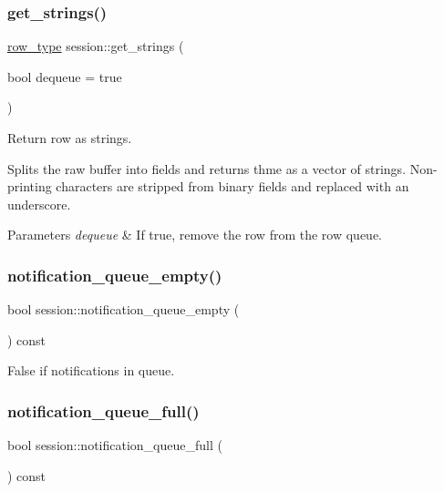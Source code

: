 \subsubsection{\texorpdfstring{get\+\_\+strings()}{get\_strings()}}
{\footnotesize\ttfamily \hyperlink{classsession_ae75ba42ea21ef0fabffb963ca7e36380}{row\+\_\+type} session\+::get\+\_\+strings (\begin{DoxyParamCaption}\item[{bool}]{dequeue = {\ttfamily true} }\end{DoxyParamCaption})\hspace{0.3cm}{\ttfamily [inline]}}



Return row as strings. 

Splits the raw buffer into fields and returns thme as a vector of strings. Non-\/printing characters are stripped from binary fields and replaced with an underscore.


\begin{DoxyParams}{Parameters}
{\em dequeue} & If true, remove the row from the row queue. \\
\hline
\end{DoxyParams}
\mbox{\label{classsession_af492668f758ee3fe77de1ec3d22397b6}} 
\subsubsection{\texorpdfstring{notification\+\_\+queue\+\_\+empty()}{notification\_queue\_empty()}}
{\footnotesize\ttfamily bool session\+::notification\+\_\+queue\+\_\+empty (\begin{DoxyParamCaption}{ }\end{DoxyParamCaption}) const\hspace{0.3cm}{\ttfamily [inline]}}



False if notifications in queue. 

\mbox{\label{classsession_a2e6188e1e5d492d6fdf471f3437917d7}} 
\subsubsection{\texorpdfstring{notification\+\_\+queue\+\_\+full()}{notification\_queue\_full()}}
{\footnotesize\ttfamily bool session\+::notification\+\_\+queue\+\_\+full (\begin{DoxyParamCaption}{ }\end{DoxyParamCaption}) const\hspace{0.3cm}{\ttfamily [inline]}}



